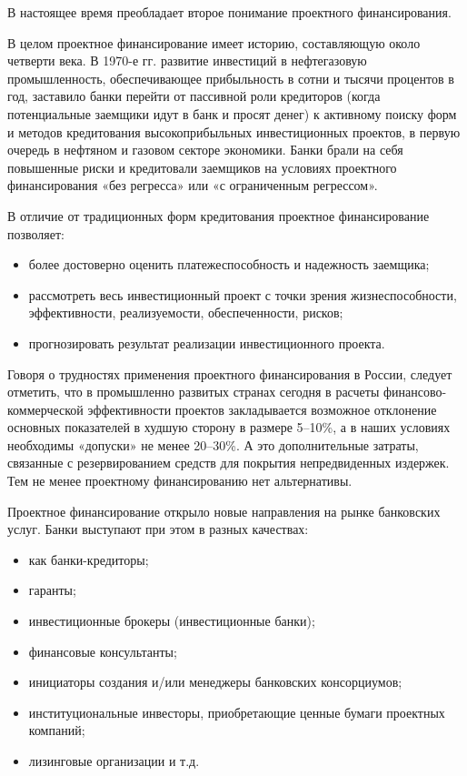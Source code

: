 В настоящее время преобладает второе понимание проектного финансирования.

В целом проектное финансирование имеет историю, составляющую около четверти века.
В 1970-е гг. развитие инвестиций в нефтегазовую промышленность, обеспечивающее прибыльность в сотни и тысячи процентов в год, заставило банки перейти от пассивной роли кредиторов (когда потенциальные заемщики идут в банк и просят денег) к активному поиску форм и методов кредитования высокоприбыльных инвестиционных проектов, в первую очередь в нефтяном и газовом секторе экономики.
Банки брали на себя повышенные риски и кредитовали заемщиков на условиях проектного финансирования «без регресса» или «с ограниченным регрессом».

В отличие от традиционных форм кредитования проектное финансирование позволяет:
\begin{itemize}
	\item более достоверно оценить платежеспособность и надежность заемщика;
	\item рассмотреть весь инвестиционный проект с точки зрения жизнеспособности, эффективности, реализуемости, обеспеченности, рисков;
	\item прогнозировать результат реализации инвестиционного проекта.
\end{itemize}

Говоря о трудностях применения проектного финансирования в России, следует отметить, что в промышленно развитых странах сегодня в расчеты финансово-коммерческой эффективности проектов закладывается возможное отклонение основных показателей в худшую сторону в размере 5--10\%, а в наших условиях необходимы «допуски» не менее 20--30\%.
А это дополнительные затраты, связанные с резервированием средств для покрытия непредвиденных издержек.
Тем не менее проектному финансированию нет альтернативы.

Проектное финансирование открыло новые направления на рынке банковских услуг.
Банки выступают при этом в разных качествах:
\begin{itemize}
	\item  как банки-кредиторы;
	\item  гаранты;
	\item  инвестиционные брокеры (инвестиционные банки);
	\item  финансовые консультанты;
	\item  инициаторы создания и/или менеджеры банковских консорциумов;
	\item  институциональные инвесторы, приобретающие ценные бумаги проектных компаний;
	\item  лизинговые организации и т.д.
\end{itemize}

